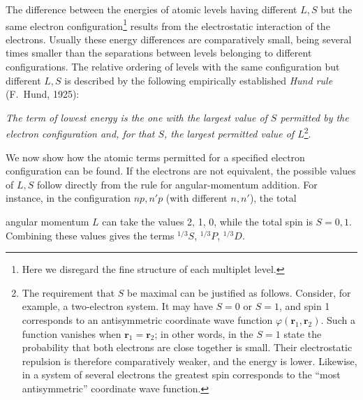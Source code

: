 The difference between the energies of atomic levels having different $L,S$
but the same electron configuration\footnote{Here we disregard the fine
structure of each multiplet level.} results from the electrostatic interaction
of the electrons. Usually these energy differences are comparatively small,
being several times smaller than the separations between levels belonging to
different configurations. The relative ordering of levels with the same
configuration but different $L,S$ is described by the following empirically
established \emph{Hund rule} (F.~Hund, 1925):

\emph{The term of lowest energy is the one with the largest value of $S$
permitted by the electron configuration and, for that $S$, the largest
permitted value of $L$}\footnote{The requirement that $S$ be maximal can be
justified as follows. Consider, for example, a two-electron system. It may
have $S=0$ or $S=1$, and spin 1 corresponds to an antisymmetric coordinate
wave function $\varphi(\mathbf r_1,\mathbf r_2)$. Such a function vanishes
when $\mathbf r_1=\mathbf r_2$; in other words, in the $S=1$ state the
probability that both electrons are close together is small. Their
electrostatic repulsion is therefore comparatively weaker, and the energy is
lower. Likewise, in a system of several electrons the greatest spin
corresponds to the ``most antisymmetric'' coordinate wave function.}.

We now show how the atomic terms permitted for a specified electron
configuration can be found. If the electrons are not equivalent, the possible
values of $L,S$ follow directly from the rule for angular-momentum addition.
For instance, in the configuration $np,n'p$ (with different $n,n'$), the
total

angular momentum $L$ can take the values 2, 1, 0, while the total spin is
$S=0,1$. Combining these values gives the terms ${}^{1/3}S$, ${}^{1/3}P$,
${}^{1/3}D$.

